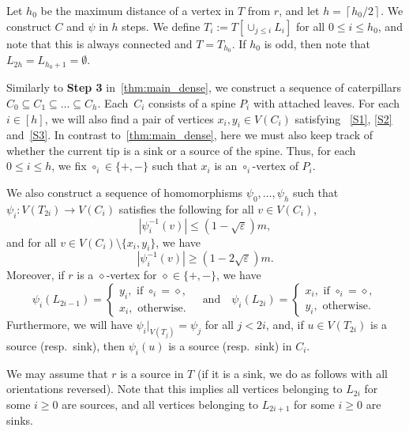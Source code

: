 \documentclass[11pt]{article}
\numberwithin{equation}{section}
\newcommand{\inv}{^{-1}}
\renewcommand{\geq}{\geqslant}
\renewcommand{\leq}{\leqslant}
\newcommand{\ceil}[1]{{\left\lceil #1 \right\rceil}}
\def\inv{^{-1}}
\let\eps=\varepsilon
\theoremstyle{definition}
\def\eps{{\varepsilon}}
\begin{document}
Let $h_0$ be the maximum distance of a vertex in $T$ from $r$, and let $h = \ceil{h_0/2}$.
We construct $C$ and $\psi$ in $h$ steps. We define $T_i := T[\cup_{j \leq i} L_i]$ for all $0 \leq i \leq h_0$, and note that this is always connected and $T = T_{h_0}$. If $h_0$ is odd, then note that $L_{2h} = L_{h_0+1} = \emptyset$.

Similarly to \textbf{Step 3} in~\cref{thm:main_dense}, we construct a sequence of caterpillars
$C_0\subseteq C_1\subseteq \dots \subseteq C_h$. Each~$C_i$ consists of a spine $P_i$ with attached leaves.
For each $i\in [h]$, we will also find a pair of vertices $x_i,y_i\in V(C_i)$
satisfying ~\ref{S1}, \ref{S2} and~\ref{S3}. In contrast to~\cref{thm:main_dense}, here we 
must also keep track of whether the current tip is a sink or a source of the spine. Thus, for each $0\leq i \leq h$, 
we fix $\circ_i \in \{+,-\}$ such that $x_i$ is an $\circ_i$-vertex of $P_i$.

We also construct a sequence of homomorphisms $\psi_0,\dots,\psi_h$ such that $\psi_i:V(T_{2i})\longrightarrow V(C_i)$ satisfies the following for all $v\in V(C_i)$,
\begin{equation}
    \label{eq:space_in_cat_layers}
    |\psi_i\inv(v)|\leq (1-\sqrt{\eps})m,
\end{equation}
and for all $v\in V(C_i)\setminus \{x_i,y_i\}$, we have
\begin{equation}
    \label{eq:full_cat_i_layers}
    |\psi_i\inv(v)|\geq (1-2\sqrt{\eps})m.
\end{equation}
Moreover, if $r$ is a $\diamond$-vertex for $\diamond\in \{+,-\}$, we have 
\begin{equation}
    \label{eq:alt_spine}
    \psi_i(L_{2i-1})= \begin{cases}
        y_i, \text{ if } \circ_i = \diamond,\\
        x_i, \text{ otherwise}.
    \end{cases} \quad \text{and} \quad \psi_i(L_{2i})= \begin{cases}
        x_i, \text{ if } \circ_i = \diamond,\\
        y_i, \text{ otherwise.}
    \end{cases}
\end{equation}
Furthermore, we will have $\psi_i|_{V(T_j)} = \psi_j$ for all $j<2i$, and, if $u\in V(T_{2i})$ is a source (resp.\ sink), then $\psi_i(u)$ is a source (resp.\ sink) in $C_i$. 

We may assume that $r$ is a source in $T$ (if it is a sink, we do as follows with all orientations reversed).
Note that this implies all vertices belonging to $L_{2i}$ for some $i
\geq 0$ are sources, and all vertices belonging to $L_{2i+1}$ for some $i\geq 0$ are sinks.
\end{document}
